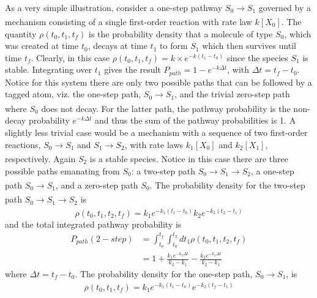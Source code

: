 \paragraph{}
As a very simple illustration, consider a one-step pathway $S_0 \xrightarrow []{}S_1$ governed by a
mechanism consisting of a single first-order reaction with rate law $k\left[X_0\right]$. The quantity
$\rho(t_0, t_1, t_f)$ is the probability density that a molecule of type $S_0$, which was created at
time $t_0$, decays at time $t_1$ to form $S_1$ which then survives until time $t_f$. Clearly, in this
case $\rho(t_0, t_1, t_f) = k \times e^{-k(t_1 - t_0)}$ since the species $S_1$ is stable. Integrating over $t_1$
gives the result $P_{path} = 1 - e^{-k \Delta t}$, with $\Delta t = t_f - t_0$. Notice for this system there
are only two possible paths that can be followed by a tagged atom, viz. the one-step
path, $S_0 \xrightarrow[]{} S_1$, and the trivial zero-step path where $S_0$ does not decay. For the latter path, the pathway probability is the non-decay probability $e^{-k \Delta t}$ and thus the sum
of the pathway probabilities is 1. A slightly less trivial case would be a mechanism
with a sequence of two first-order reactions, $S_0 \xrightarrow[]{} S_1$ and $S_1 \xrightarrow[]{} S_2$, with rate laws
$k_1[X_0]$ and $k_2[X_1]$, respectively. Again $S_2$ is a stable species. Notice in this case there
are three possible paths emanating from $S_0$: a two-step path $S_0 \xrightarrow[]{} S_1 \xrightarrow[]{} S_2$, a one-step
path $S_0 \xrightarrow[]{} S_1$, and a zero-step path $S_0$. The probability density for the two-step path
$S_0 \xrightarrow[]{} S_1 \xrightarrow[]{} S_2$ is
\begin{equation}
\label{ch2:eqn5}
\rho(t_0,t_1,t_2,t_f) = k_1 e^{-k_1(t_1-t_0)} k_2e^{-k_2(t_2-t_1)} 
\end{equation}
and the total integrated pathway probability is
\begin{equation}
\label{ch2:eqn6}
\begin{split}
P_{path}(2-step) &= \int_{t_0}^{t_f}{\int_{t_0}^{t_2}{dt_1 \rho(t_0, t_1, t_2, t_f) }} \\
&= 1 + \frac{k_1 e^{- k_2 \Delta t}}{k_2 - k_1} - \frac{k_2 e^{- k_1 \Delta t}}{k_2 - k_1} 
\end{split}
\end{equation}
where $\Delta t = t_f - t_0$. The probability density for the one-step path, $S_0 \xrightarrow []{} S_1$, is
\begin{equation}
\label{ch2:eqn7}
\rho(t_0,t_1,t_f) = k_1 e^{-k_1(t_1-t_0)} e^{-k_2(t_f-t_1)} 
\end{equation}
